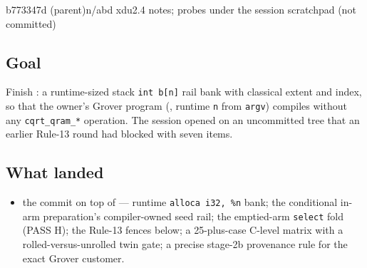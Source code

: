 %
  {b773347d (parent)}{n/a}{bd xdu2.4 notes; probes under the session scratchpad (not committed)}

\subsection*{Goal}
Finish : a runtime-sized stack \texttt{int b[n]}
rail bank with classical extent and index, so that the owner's Grover program
(, runtime \texttt{n} from \texttt{argv}) compiles
without any \texttt{cqrt\_qram\_*} operation. The session opened on an
uncommitted tree that an earlier Rule-13 round had blocked with seven items.

\subsection*{What landed}
\begin{itemize}
  \item the  commit on top of  --- runtime \texttt{alloca i32, \%n}
    bank; the conditional in-arm preparation's compiler-owned seed rail; the
    emptied-arm \texttt{select} fold (PASS H); the Rule-13 fences below; a
    25-plus-case C-level matrix with a rolled-versus-unrolled twin gate; a
    precise stage-2b provenance rule for the exact Grover customer.
\end{itemize}


